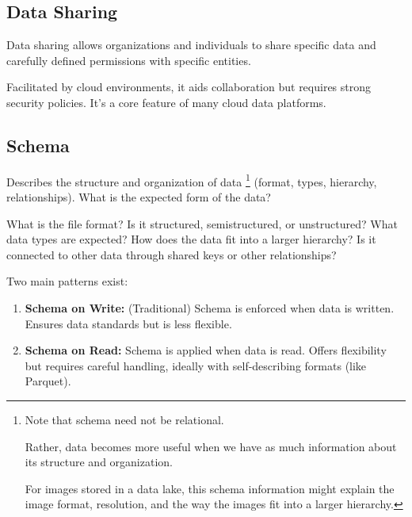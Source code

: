 \subsection*{Data Sharing}
Data sharing allows organizations and individuals to share specific
data and carefully defined permissions with specific entities.

Facilitated by cloud environments, it aids collaboration but requires
strong security policies. It's a core feature of many cloud data
platforms.


\subsection*{Schema}
Describes the structure and organization of data
\footnote{
    Note that schema need not be relational.
    
    Rather, data becomes more useful when we
    have as much information about its
    structure and organization.
    
    For images stored in  a data lake, this schema
    information might explain the image format,
    resolution, and the way the images fit into
    a larger hierarchy.
}
(format, types, hierarchy, relationships).
What is the expected form of the data?

What is the file format? Is it structured, semistructured,
or unstructured?
What data types are expected? How does the data fit into a larger
hierarchy?
Is it connected to other data through shared keys or other
relationships?

Two main patterns exist:
\begin{enumerate}
    \item \textbf{Schema on Write:} (Traditional) Schema is enforced
    when data is written. Ensures data standards but is less flexible.

    \item \textbf{Schema on Read:} Schema is applied when data is read.
    Offers flexibility but requires careful handling, ideally with
    self-describing formats (like Parquet).
\end{enumerate}


